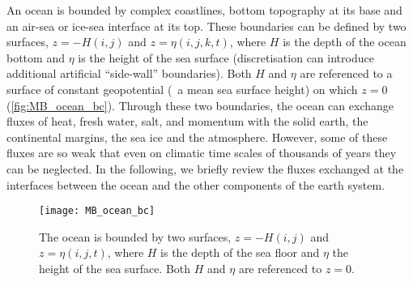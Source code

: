 \documentclass[../main/NEMO_manual]{subfiles}
\begin{document}
An ocean is bounded by complex coastlines, bottom topography at its base and
an air-sea or ice-sea interface at its top.
These boundaries can be defined by two surfaces, $z = - H(i,j)$ and $z = \eta(i,j,k,t)$,
where $H$ is the depth of the ocean bottom and $\eta$ is the height of the sea surface
(discretisation can introduce additional artificial ``side-wall'' boundaries).
Both $H$ and $\eta$ are referenced to a surface of constant geopotential
(\ie\ a mean sea surface height) on which $z = 0$ (\autoref{fig:MB_ocean_bc}).
Through these two boundaries, the ocean can exchange fluxes of heat, fresh water, salt,
and momentum with the solid earth, the continental margins, the sea ice and the atmosphere.
However, some of these fluxes are so weak that
even on climatic time scales of thousands of years they can be neglected.
In the following, we briefly review the fluxes exchanged at the interfaces between the ocean and
the other components of the earth system.

\begin{figure}
  \centering
  \texttt{[image: MB\_ocean\_bc]}
  \caption[Ocean boundary conditions]{
    The ocean is bounded by two surfaces, $z = - H(i,j)$ and $z = \eta(i,j,t)$,
    where $H$ is the depth of the sea floor and $\eta$ the height of the sea surface.
    Both $H$ and $\eta$ are referenced to $z = 0$.}
  \label{fig:MB_ocean_bc}
\end{figure}
\end{document}
